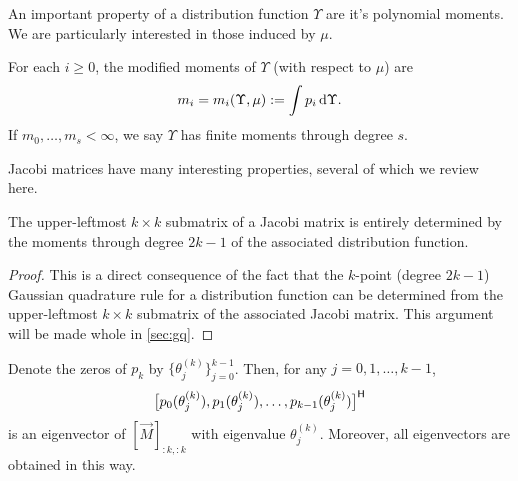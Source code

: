 An important property of a distribution function \( \Upsilon \) are it's polynomial moments.
We are particularly interested in those induced by \( \mu \).
\begin{definition}
\label{def:modified_moments}
For each \( i \geq 0 \), the modified moments of \( \Upsilon \) (with respect to \( \mu \)) are 
\begin{equation*}
    m_i = m_i(\Upsilon,\mu) := \int p_i \,\textup{d}\Upsilon.
\end{equation*}
If \( m_0, \ldots, m_{s} < \infty \), we say \( \Upsilon \) has finite moments through degree \( s \).
\end{definition}
 

Jacobi matrices have many interesting properties, several of which we review here.

\begin{lemma}
    The upper-leftmost \( k\times k \) submatrix of a Jacobi matrix is entirely determined by the moments through degree \( 2k-1 \) of the associated distribution function.
\end{lemma}

\begin{proof}
    This is a direct consequence of the fact that the \( k \)-point (degree \( 2k-1 \)) Gaussian quadrature rule for a distribution function can be determined from the upper-leftmost \( k\times k \) submatrix of the associated Jacobi matrix.
    This argument will be made whole in \cref{sec:gq}.
\end{proof}

\begin{lemma}
    \label{thm:jacobi_eigen}
    Denote the zeros of \( p_{k} \) by \( \{ \theta_j^{(k)} \}_{j=0}^{k-1} \).
Then, for any \( j=0,1,\ldots, k-1 \),
\begin{equation*}
    \label{eqn:jacobi_evec}
    \big[ p_0(\theta_{j}^{(k)}), p_1(\theta_{j}^{(k)}), \ldots, p_{k-1}(\theta_{j}^{(k)}) \big]^\cT
\end{equation*}
is an eigenvector of \( [\vec{M}]_{:k,:k} \) with eigenvalue \( \theta_{j}^{(k)} \).
Moreover, all eigenvectors are obtained in this way.
\end{lemma}


